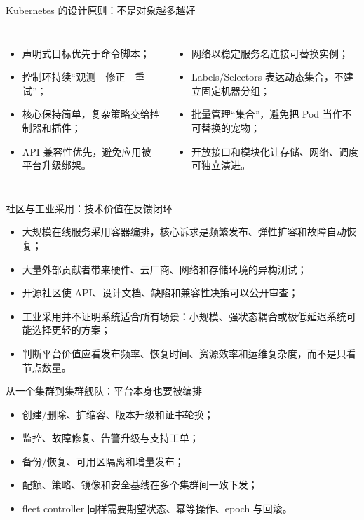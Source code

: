 \documentclass[UTF8,fontset=none,aspectratio=169,10pt]{beamer}
\begin{document}
\begin{frame}{Kubernetes 的设计原则：不是对象越多越好}
\begin{columns}[T,onlytextwidth]
\begin{itemize}
  \item 声明式目标优先于命令脚本；
  \item 控制环持续“观测—修正—重试”；
  \item 核心保持简单，复杂策略交给控制器和插件；
  \item API 兼容性优先，避免应用被平台升级绑架。
\end{itemize}
\begin{itemize}
  \item 网络以稳定服务名连接可替换实例；
  \item Labels/Selectors 表达动态集合，不建立固定机器分组；
  \item 批量管理“集合”，避免把 Pod 当作不可替换的宠物；
  \item 开放接口和模块化让存储、网络、调度可独立演进。
\end{itemize}
\end{columns}
\vfill
{}
\end{frame}

\begin{frame}{社区与工业采用：技术价值在反馈闭环}
\begin{itemize}
  \item 大规模在线服务采用容器编排，核心诉求是频繁发布、弹性扩容和故障自动恢复；
  \item 大量外部贡献者带来硬件、云厂商、网络和存储环境的异构测试；
  \item 开源社区使 API、设计文档、缺陷和兼容性决策可以公开审查；
  \item 工业采用并不证明系统适合所有场景：小规模、强状态耦合或极低延迟系统可能选择更轻的方案；
  \item 判断平台价值应看发布频率、恢复时间、资源效率和运维复杂度，而不是只看节点数量。
\end{itemize}
\vfill
{}
\end{frame}

\begin{frame}{从一个集群到集群舰队：平台本身也要被编排}
\begin{itemize}
  \item 创建/删除、扩缩容、版本升级和证书轮换；
  \item 监控、故障修复、告警升级与支持工单；
  \item 备份/恢复、可用区隔离和增量发布；
  \item 配额、策略、镜像和安全基线在多个集群间一致下发；
  \item fleet controller 同样需要期望状态、幂等操作、epoch 与回滚。
\end{itemize}
\vfill
{}
\end{frame}
\end{document}
